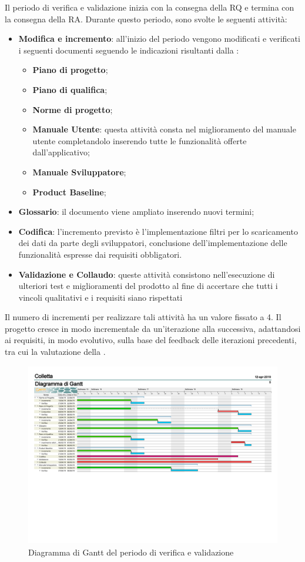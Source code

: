 Il periodo di verifica e validazione inizia con la consegna della RQ e termina con la consegna della RA.\newline
Durante questo periodo, sono svolte le seguenti attività:
\begin{itemize}
	\item \textbf{Modifica e incremento}: all'inizio  del  periodo  vengono  modificati  e  verificati  i seguenti documenti seguendo le indicazioni risultanti dalla \RQ{}:
	\begin{itemize}
		\item \textbf{Piano di progetto};
		\item \textbf{Piano di qualifica};
		\item \textbf{Norme di progetto};
		\item \textbf{Manuale Utente}: questa attività consta nel miglioramento del manuale utente completandolo inserendo tutte le funzionalità offerte dall'applicativo;
		\item \textbf{Manuale Sviluppatore};
		\item \textbf{Product Baseline};
	\end{itemize}
	\item \textbf{Glossario}: il documento viene ampliato inserendo nuovi termini;
	\item \textbf{Codifica}: l'incremento previsto è l'implementazione filtri per lo scaricamento dei dati da parte degli sviluppatori, conclusione dell'implementazione delle funzionalità espresse dai requisiti obbligatori.
	\item \textbf{Validazione e Collaudo}: queste attività consistono nell'esecuzione di ulteriori test e miglioramenti del prodotto al fine di accertare che tutti i vincoli qualitativi e i requisiti siano rispettati
\end{itemize}
Il numero di incrementi per realizzare tali attività ha un valore fissato a 4.
Il progetto cresce in modo incrementale da un'iterazione alla successiva, adattandosi ai requisiti, in modo evolutivo, sulla base del feedback delle iterazioni precedenti, tra cui la valutazione della \RQ{}.
\begin{figure}[H]
		\hspace*{-1.5cm}
	\includegraphics[width=19.4cm, height=8cm]{Pianificazione/verificaValidazione.pdf}
	\caption{Diagramma di Gantt del periodo di verifica e validazione}
\end{figure}